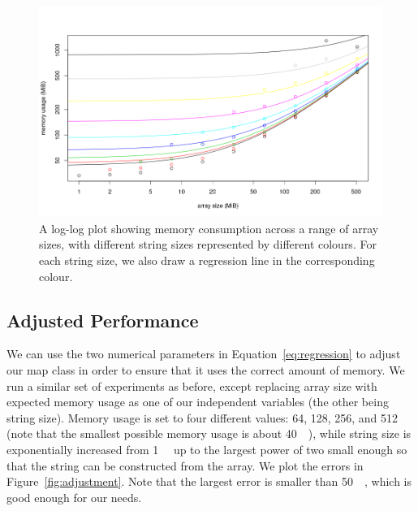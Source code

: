 \documentclass{article}
\begin{document}
\begin{figure}
  \centering
  \includegraphics[width=\textwidth]{../local_experiments/memory_tests/prediction1.png}
  \caption{A log-log plot showing memory consumption across a range of array
    sizes, with different string sizes represented by different colours. For
    each string size, we also draw a regression line in the corresponding
    colour.}
  \label{fig:regression2}
\end{figure}

\subsection{Adjusted Performance} \label{sec:after_adjustments}

We can use the two numerical parameters in Equation~\eqref{eq:regression} to
adjust our map class in order to ensure that it uses the correct amount
of memory. We run a similar set of experiments as before, except replacing array
size with expected memory usage as one of our independent variables (the other
being string size). Memory usage is set to four different values: 64, 128,
256, and \SI{512}{\mebi\byte} (note that the smallest possible memory usage is
about \SI{40}{\mebi\byte}), while string size is exponentially increased from
\SI{1}{\mebi\byte} up to the largest power of two small enough so that the
string can be constructed from the array. We plot the errors in
Figure~\ref{fig:adjustment}. Note that the largest error is smaller than
\SI{50}{\kibi\byte}, which is good enough for our needs.
\end{document}
